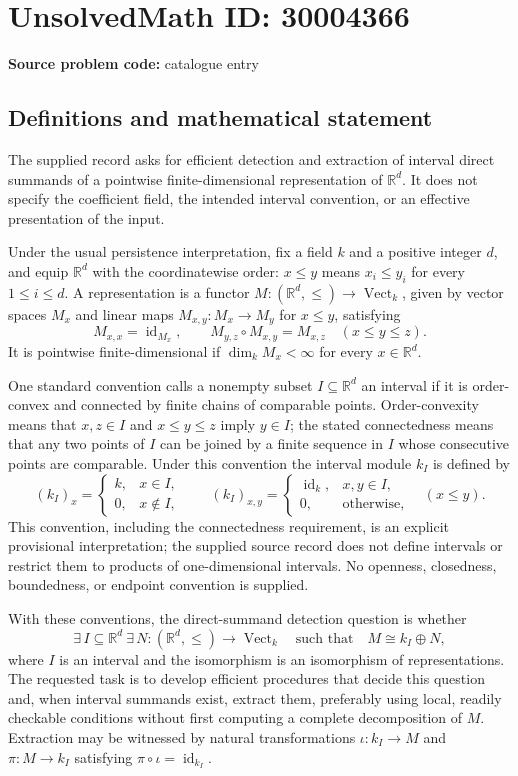 \documentclass[11pt]{article}
\newcommand{\R}{\mathbb{R}}
\begin{document}
\section*{UnsolvedMath ID: 30004366}
\textbf{Source problem code:} catalogue entry
\subsection{Definitions and mathematical statement}
The supplied record asks for efficient detection and extraction of interval direct summands of a pointwise finite-dimensional representation of $\R^d$. It does not specify the coefficient field, the intended interval convention, or an effective presentation of the input.

Under the usual persistence interpretation, fix a field $k$ and a positive integer $d$, and equip $\R^d$ with the coordinatewise order: $x\leq y$ means $x_i\leq y_i$ for every $1\leq i\leq d$. A representation is a functor $M:(\R^d,\leq)\to\operatorname{Vect}_k$, given by vector spaces $M_x$ and linear maps $M_{x,y}:M_x\to M_y$ for $x\leq y$, satisfying
\[
M_{x,x}=\operatorname{id}_{M_x},\qquad M_{y,z}\circ M_{x,y}=M_{x,z}\quad(x\leq y\leq z).
\]
It is pointwise finite-dimensional if $\dim_k M_x<\infty$ for every $x\in\R^d$.

One standard convention calls a nonempty subset $I\subseteq\R^d$ an interval if it is order-convex and connected by finite chains of comparable points. Order-convexity means that $x,z\in I$ and $x\leq y\leq z$ imply $y\in I$; the stated connectedness means that any two points of $I$ can be joined by a finite sequence in $I$ whose consecutive points are comparable. Under this convention the interval module $k_I$ is defined by
\[
(k_I)_x=\begin{cases}k,&x\in I,\\0,&x\notin I,\end{cases}
\qquad
(k_I)_{x,y}=\begin{cases}\operatorname{id}_k,&x,y\in I,\\0,&\text{otherwise},\end{cases}\quad(x\leq y).
\]
This convention, including the connectedness requirement, is an explicit provisional interpretation; the supplied source record does not define intervals or restrict them to products of one-dimensional intervals. No openness, closedness, boundedness, or endpoint convention is supplied.

With these conventions, the direct-summand detection question is whether
\[
\exists\, I\subseteq\R^d\ \exists\, N:(\R^d,\leq)\to\operatorname{Vect}_k
\quad\text{such that}\quad M\cong k_I\oplus N,
\]
where $I$ is an interval and the isomorphism is an isomorphism of representations. The requested task is to develop efficient procedures that decide this question and, when interval summands exist, extract them, preferably using local, readily checkable conditions without first computing a complete decomposition of $M$. Extraction may be witnessed by natural transformations $\iota:k_I\to M$ and $\pi:M\to k_I$ satisfying $\pi\circ\iota=\operatorname{id}_{k_I}$.
\end{document}
